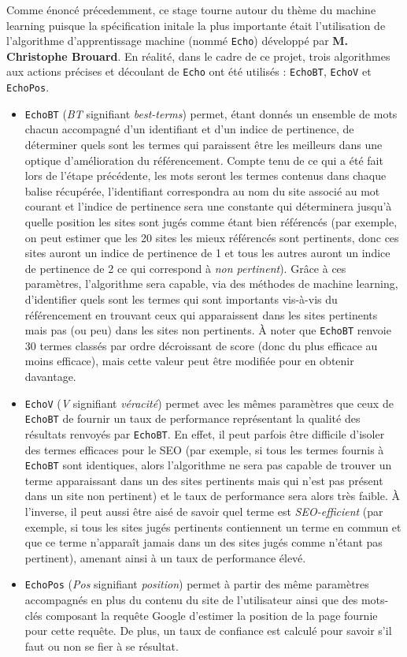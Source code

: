 \documentclass[12pt]{article}
\begin{document}
Comme énoncé précedemment, ce stage tourne autour du thème du machine learning puisque la spécification initale la plus importante était l'utilisation de l'algorithme d'apprentissage machine (nommé \texttt{Echo}) développé par \textbf{M. Christophe Brouard}. En réalité, dans le cadre de ce projet, trois algorithmes aux actions précises et découlant de \texttt{Echo} ont été utilisés : \texttt{EchoBT}, \texttt{EchoV} et \texttt{EchoPos}.
\begin{itemize}
	\item \texttt{EchoBT} (\textit{BT} signifiant \textit{best-terms}) permet, étant donnés un ensemble de mots chacun accompagné d'un identifiant et d'un indice de pertinence, de déterminer quels sont les termes qui paraissent être les meilleurs dans une optique d'amélioration du référencement. Compte tenu de ce qui a été fait lors de l'étape précédente, les mots seront les termes contenus dans chaque balise récupérée, l'identifiant correspondra au nom du site associé au mot courant et l'indice de pertinence sera une constante qui déterminera jusqu'à quelle position les sites sont jugés comme étant bien référencés (par exemple, on peut estimer que les 20 sites les mieux référencés sont pertinents, donc ces sites auront un indice de pertinence de 1 et tous les autres auront un indice de pertinence de 2 ce qui correspond à \textit{non pertinent}). Grâce à ces paramètres, l'algorithme sera capable, via des méthodes de machine learning, d'identifier quels sont les termes qui sont importants vis-à-vis du référencement en trouvant ceux qui apparaissent dans les sites pertinents mais pas (ou peu) dans les sites non pertinents. À noter que \texttt{EchoBT} renvoie 30 termes classés par ordre décroissant de score (donc du plus efficace au moins efficace), mais cette valeur peut être modifiée pour en obtenir davantage.
	\item \texttt{EchoV} (\textit{V} signifiant \textit{véracité}) permet avec les mêmes paramètres que ceux de \texttt{EchoBT} de fournir un taux de performance représentant la qualité des résultats renvoyés par \texttt{EchoBT}. En effet, il peut parfois être difficile d'isoler des termes efficaces pour le SEO (par exemple, si tous les termes fournis à \texttt{EchoBT} sont identiques, alors l'algorithme ne sera pas capable de trouver un terme apparaissant dans un des sites pertinents mais qui n'est pas présent dans un site non pertinent) et le taux de performance sera alors très faible. À l'inverse, il peut aussi être aisé de savoir quel terme est \textit{SEO-efficient} (par exemple, si tous les sites jugés pertinents contiennent un terme en commun et que ce terme n'apparaît jamais dans un des sites jugés comme n'étant pas pertinent), amenant ainsi à un taux de performance élevé.
	\item \texttt{EchoPos} (\textit{Pos} signifiant \textit{position}) permet à partir des même paramètres accompagnés en plus du contenu du site de l'utilisateur ainsi que des mots-clés composant la requête Google d'estimer la position de la page fournie pour cette requête. De plus, un taux de confiance est calculé pour savoir s'il faut ou non se fier à se résultat.
\end{itemize}
\end{document}
